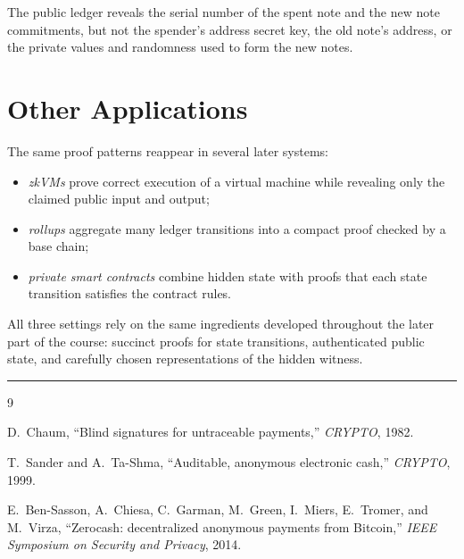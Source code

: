 \documentclass[11pt]{article}
\begin{document}
\begin{remark}
The public ledger reveals the serial number of the spent note and the new note
commitments, but not the spender's address secret key, the old note's address,
or the private values and randomness used to form the new notes.
\end{remark}

\section{Other Applications}

The same proof patterns reappear in several later systems:
\begin{itemize}
  \item \emph{zkVMs} prove correct execution of a virtual machine while
        revealing only the claimed public input and output;
  \item \emph{rollups} aggregate many ledger transitions into a compact proof
        checked by a base chain;
  \item \emph{private smart contracts} combine hidden state with proofs that
        each state transition satisfies the contract rules.
\end{itemize}

All three settings rely on the same ingredients developed throughout the later
part of the course: succinct proofs for state transitions, authenticated public
state, and carefully chosen representations of the hidden witness.

\bigskip
\hrule
\bigskip

\begin{thebibliography}{9}

  D.~Chaum,
  ``Blind signatures for untraceable payments,''
  \emph{CRYPTO}, 1982.

  T.~Sander and A.~Ta-Shma,
  ``Auditable, anonymous electronic cash,''
  \emph{CRYPTO}, 1999.

  E.~Ben-Sasson, A.~Chiesa, C.~Garman, M.~Green, I.~Miers, E.~Tromer,
  and M.~Virza,
  ``Zerocash: decentralized anonymous payments from Bitcoin,''
  \emph{IEEE Symposium on Security and Privacy}, 2014.

\end{thebibliography}
\end{document}
